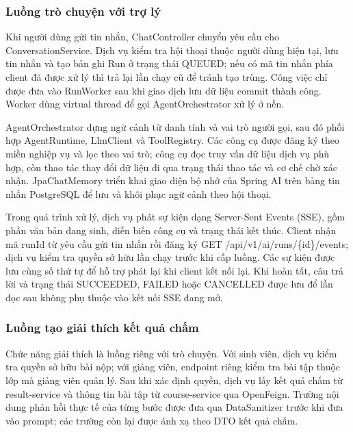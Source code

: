 \documentclass[../BTL.tex]{subfiles}
\begin{document}
\subsubsection{Luồng trò chuyện với trợ lý}

Khi người dùng gửi tin nhắn, \textnormal{ChatController} chuyển yêu cầu cho \textnormal{ConversationService}. Dịch vụ kiểm tra hội thoại thuộc người dùng hiện tại, lưu tin nhắn và tạo bản ghi \textnormal{Run} ở trạng thái \textnormal{QUEUED}; nếu có mã tin nhắn phía client đã được xử lý thì trả lại lần chạy cũ để tránh tạo trùng. Công việc chỉ được đưa vào \textnormal{RunWorker} sau khi giao dịch lưu dữ liệu commit thành công. Worker dùng virtual thread để gọi \textnormal{AgentOrchestrator} xử lý ở nền.

\textnormal{AgentOrchestrator} dựng ngữ cảnh từ danh tính và vai trò người gọi, sau đó phối hợp \textnormal{AgentRuntime}, \textnormal{LlmClient} và \textnormal{ToolRegistry}. Các công cụ được đăng ký theo miền nghiệp vụ và lọc theo vai trò; công cụ đọc truy vấn dữ liệu dịch vụ phù hợp, còn thao tác thay đổi dữ liệu đi qua trạng thái thao tác và cơ chế chờ xác nhận. \textnormal{JpaChatMemory} triển khai giao diện bộ nhớ của Spring AI trên bảng tin nhắn PostgreSQL để lưu và khôi phục ngữ cảnh theo hội thoại.

Trong quá trình xử lý, dịch vụ phát sự kiện dạng Server-Sent Events (SSE), gồm phần văn bản đang sinh, diễn biến công cụ và trạng thái kết thúc. Client nhận mã \textnormal{runId} từ yêu cầu gửi tin nhắn rồi đăng ký \textnormal{GET /api/v1/ai/runs/\{id\}/events}; dịch vụ kiểm tra quyền sở hữu lần chạy trước khi cấp luồng. Các sự kiện được lưu cùng số thứ tự để hỗ trợ phát lại khi client kết nối lại. Khi hoàn tất, câu trả lời và trạng thái \textnormal{SUCCEEDED}, \textnormal{FAILED} hoặc \textnormal{CANCELLED} được lưu để lần đọc sau không phụ thuộc vào kết nối SSE đang mở.

\subsubsection{Luồng tạo giải thích kết quả chấm}

Chức năng giải thích là luồng riêng với trò chuyện. Với sinh viên, dịch vụ kiểm tra quyền sở hữu bài nộp; với giảng viên, endpoint riêng kiểm tra bài tập thuộc lớp mà giảng viên quản lý. Sau khi xác định quyền, dịch vụ lấy kết quả chấm từ \textnormal{result-service} và thông tin bài tập từ \textnormal{course-service} qua OpenFeign. Trường nội dung phản hồi thực tế của từng bước được đưa qua \textnormal{DataSanitizer} trước khi đưa vào prompt; các trường còn lại được ánh xạ theo DTO kết quả chấm.
\end{document}
